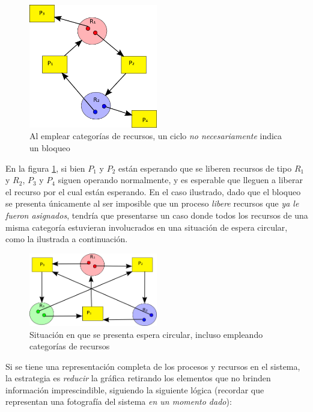 \documentclass[11pt,fleqn]{book} %
\begin{document}
\begin{figure}[htb]
\centering
\includegraphics[width=0.5\textwidth]{./img/ciclo_no_bloqueo.png}
\caption{\label{PROC_ciclo_no_bloqueo}Al emplear categorías de recursos, un ciclo \emph{no necesariamente} indica un bloqueo}
\end{figure}

En la figura \ref{PROC_ciclo_no_bloqueo}, si bien $P_1$ y $P_2$ están
esperando que se liberen recursos de tipo $R_1$ y $R_2$, $P_3$ y $P_4$
siguen operando normalmente, y es esperable que lleguen a liberar el
recurso por el cual están esperando. En el caso ilustrado, dado que el
bloqueo se presenta únicamente al ser imposible que un proceso
\emph{libere} recursos que \emph{ya le fueron asignados}, tendría que
presentarse un caso donde todos los recursos de una misma categoría
estuvieran involucrados en una situación de espera circular, como la
ilustrada a continuación.

\begin{figure}[htb]
\centering
\includegraphics[width=0.5\textwidth]{./img/bloqueo_con_categorias.png}
\caption{\label{PROC_bloqueo_con_categorias}Situación en que se presenta espera circular, incluso empleando categorías de recursos}
\end{figure}

Si se tiene una representación completa de los procesos y recursos en
el sistema, la estrategia es \emph{reducir} la gráfica retirando los
elementos que no brinden información imprescindible, siguiendo la
siguiente lógica (recordar que representan una fotografía del
sistema \emph{en un momento dado}):
\end{document}
